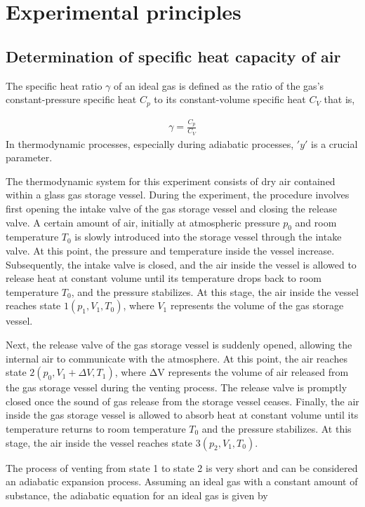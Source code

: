 \documentclass[UTF8]{article}
\begin{document}
    
        
	\section{Experimental principles}   
	\subsection{Determination of specific heat capacity of air}
	The specific heat ratio $\gamma $ of an ideal gas is defined as the ratio of the gas's constant-pressure specific heat $C_p$ to its constant-volume specific heat $C_V$ that is,
	
	\begin{eqnarray}
	\gamma=\frac{C_{p}}{C_{V}}
	\end{eqnarray}
	In thermodynamic processes, especially during adiabatic processes, $'y'$ is a crucial parameter.
	
	The thermodynamic system for this experiment consists of dry air contained within a glass gas storage vessel. During the experiment, the procedure involves first opening the intake valve of the gas storage vessel and closing the release valve. A certain amount of air, initially at atmospheric pressure $p_0$ and room temperature $T_0$ is slowly introduced into the storage vessel through the intake valve. At this point, the pressure and temperature inside the vessel increase. Subsequently, the intake valve is closed, and the air inside the vessel is allowed to release heat at constant volume until its temperature drops back to room temperature $T_0$, and the pressure stabilizes. At this stage, the air inside the vessel reaches state $1(p_1, V_1, T_0)$, where $V_1$ represents the volume of the gas storage vessel.
	
	Next, the release valve of the gas storage vessel is suddenly opened, allowing the internal air to communicate with the atmosphere. At this point, the air reaches state $2(p_0, V_1+ΔV, T_1)$, where ΔV represents the volume of air released from the gas storage vessel during the venting process. The release valve is promptly closed once the sound of gas release from the storage vessel ceases. Finally, the air inside the gas storage vessel is allowed to absorb heat at constant volume until its temperature returns to room temperature $T_0$ and the pressure stabilizes. At this stage, the air inside the vessel reaches state $3(p_2, V_1, T_0)$.
	 
	The process of venting from state 1 to state 2 is very short and can be considered an adiabatic expansion process. Assuming an ideal gas with a constant amount of substance, the adiabatic equation for an ideal gas is given by 
	
\end{document}
